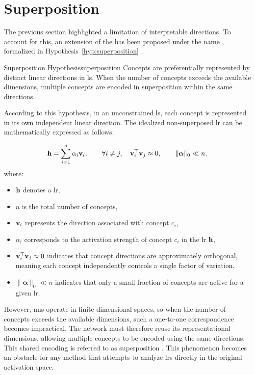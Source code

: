 \section{Superposition}
\label{sec:latent_space_analysis_superposition}

The previous section highlighted a limitation of interpretable directions.
To account for this, an extension of the \ConceptHypothesisName has been proposed under the name \SuperpositionHypothesisName, formalized in Hypothesis~\ref{hyp:superposition} \parencite{elhage2022superposition}.

\begin{hypothesis}{Superposition Hypothesis}{superposition}
Concepts are preferentially represented by distinct linear directions in \gls{ls}.
When the number of concepts exceeds the available dimensions, multiple concepts are encoded in superposition within the same directions.
\end{hypothesis}

According to this hypothesis, in an unconstrained \gls{ls}, each concept is represented in its own independent linear direction.
The idealized non-superposed \gls{lr} can be mathematically expressed as follows:
\begin{equationwhere}
\[
\latentRepresentation = \sum_{i=1}^{n} \alpha_i \vect{v}_i,
\qquad
\forall i \neq j,\quad \vect{v}_i^\top \vect{v}_j \approx 0,
\qquad
\|\boldsymbol{\alpha}\|_0 \ll n,
\]
where:
\begin{itemize}
    \item $\latentRepresentation$ denotes a \gls{lr},
    \item $n$ is the total number of concepts,
    \item $\mathbf{v}_i$ represents the direction associated with concept $c_i$,
    \item $\alpha_i$ corresponds to the activation strength of concept $c_i$ in the \gls{lr} $\latentRepresentation$,
    \item $\mathbf{v}_i^\top \mathbf{v}_j \approx 0$ indicates that concept directions are approximately orthogonal, meaning each concept independently controls a single factor of variation,
    \item $\|\boldsymbol{\alpha}\|_0 \ll n$ indicates that only a small fraction of concepts are active for a given \gls{lr}.
\end{itemize}
\end{equationwhere}

However, \glspl{nn} operate in finite-dimensional spaces, so when the number of concepts exceeds the available dimensions, such a one-to-one correspondence becomes impractical.
The network must therefore reuse its representational dimensions, allowing multiple concepts to be encoded using the same directions.
This shared encoding is referred to as superposition \parencite{bricken2023monosemanticity}.
This phenomenon becomes an obstacle for any method that attempts to analyze \glspl{lr} directly in the original activation space.

